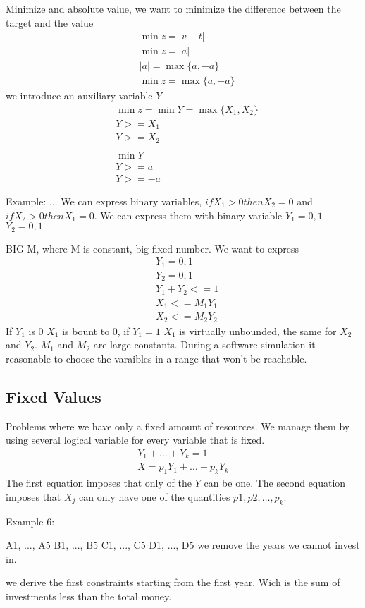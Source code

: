 \documentclass[12pt]{article}
\begin{document}
Minimize and absolute value, we want to minimize the difference between the target and the value
\begin{align*}
  & \min{z} = |v - t| \\
  & \min{z} = |a| \\
  & |a| = \max{\{a, -a\}} \\
  & \min{z} = \max{\{a, -a\}} 
\end{align*}
we introduce an auxiliary variable $Y$
\begin{align*}
  & \min{z} = \min{Y} = \max{\{X_1, X_2\}} \\
  & Y >= X_1 \\
  & Y >= X_2 \\
  \\
  & \min{Y} \\
  & Y >= a \\
  & Y >= -a
\end{align*}

Example: 
...
We can express binary variables, $if X_1 > 0 then X_2 = 0$ and $if X_2 > 0 then X_1 = 0$. We can express them with binary variable $Y_1 = 0, 1$ $Y_2 = 0, 1$

BIG M, where M is constant, big fixed number. We want to express
\begin{align*}
  & Y_1 = 0, 1 \\
  & Y_2 = 0, 1 \\ 
  & Y_1 + Y_2 <= 1 \\ 
  & X_1 <= M_1 Y_1 \\ 
  & X_2 <= M_2 Y_2 
\end{align*}
If $Y_1$ is 0 $X_1$ is bount to 0, if $Y_1 = 1$ $X_1$ is virtually unbounded, the same for $X_2$ and $Y_2$. $M_1$ and $M_2$ are large constants. During a software simulation it reasonable to choose the varaibles in a range that won't be reachable.


\subsection{Fixed Values}
Problems where we have only a fixed amount of resources. We manage them by using several logical variable for every variable that is fixed.
\begin{align*}
  Y_1 + \dots + Y_k = 1 \\
  X = p_1 Y_1 + \dots + p_k Y_k
\end{align*}
The first equation imposes that only of the $Y$ can be one. The second equation imposes that $X_j$ can only have one of the quantities $p1, p2, \dots, p_k$.


Example 6:


A1, ..., A5
B1, ..., B5
C1, ..., C5
D1, ..., D5
we remove the years we cannot invest in.

we derive the first constraints starting from the first year. Wich is the sum of investments less than the total money.
\end{document}
